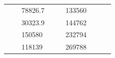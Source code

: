 \begin{table}[]
\begin{tabular}{|cclccllll}
\multicolumn{1}{|c|}{\cellcolor[HTML]{FFFFC7}}                                & \multicolumn{1}{c|}{\cellcolor[HTML]{DDFDFF}}                      & \multicolumn{1}{l|}{\cellcolor[HTML]{DDFDFF}78826.7}   & \multicolumn{1}{c|}{\cellcolor[HTML]{FFFFC7}}                                & \multicolumn{1}{c|}{\cellcolor[HTML]{DDFDFF}}                       & \multicolumn{1}{l|}{\cellcolor[HTML]{DAE8FC}133560}    &                                                                              &                                                                    &                                                        \\ \cline{3-3} \cline{6-6}
\multicolumn{1}{|c|}{\cellcolor[HTML]{FFFFC7}}                                & \multicolumn{1}{c|}{\cellcolor[HTML]{DDFDFF}}                      & \multicolumn{1}{l|}{\cellcolor[HTML]{DAE8FC}30323.9}   & \multicolumn{1}{c|}{\cellcolor[HTML]{FFFFC7}}                                & \multicolumn{1}{c|}{\cellcolor[HTML]{DDFDFF}}                       & \multicolumn{1}{l|}{\cellcolor[HTML]{DDFDFF}144762}    &                                                                              &                                                                    &                                                        \\ \cline{3-3} \cline{6-6}
\multicolumn{1}{|c|}{\cellcolor[HTML]{FFFFC7}}                                & \multicolumn{1}{c|}{\cellcolor[HTML]{DDFDFF}}                      & \multicolumn{1}{l|}{\cellcolor[HTML]{DDFDFF}150580}    & \multicolumn{1}{c|}{\cellcolor[HTML]{FFFFC7}}                                & \multicolumn{1}{c|}{\cellcolor[HTML]{DDFDFF}}                       & \multicolumn{1}{l|}{\cellcolor[HTML]{DAE8FC}232794}    &                                                                              &                                                                    &                                                        \\ \cline{3-3} \cline{6-6}
\multicolumn{1}{|c|}{\cellcolor[HTML]{FFFFC7}}                                & \multicolumn{1}{c|}{\cellcolor[HTML]{DDFDFF}}                      & \multicolumn{1}{l|}{\cellcolor[HTML]{DAE8FC}118139}    & \multicolumn{1}{c|}{\cellcolor[HTML]{FFFFC7}}                                & \multicolumn{1}{c|}{\cellcolor[HTML]{DDFDFF}}                       & \multicolumn{1}{l|}{\cellcolor[HTML]{DDFDFF}269788}    &                                                                              &                                                                    &                                                        \\ \cline{3-3} \cline{6-6}

\end{tabular}
\end{table}
